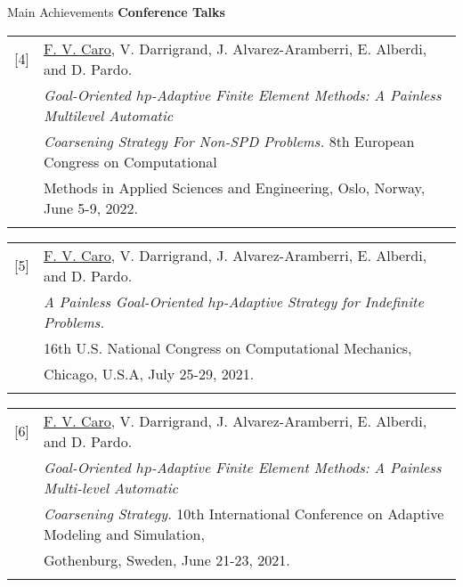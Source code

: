 \begin{frame}{Main Achievements}
\textbf{Conference Talks}
\vspace{0.2cm}

\begin{small}
\begin{tabular}{rl}
[4]&\underline{F. V. Caro}, V. Darrigrand, J. Alvarez-Aramberri, E. Alberdi, and D. Pardo. \\
& \textit{Goal-Oriented $hp$-Adaptive Finite Element Methods: A Painless Multilevel Automatic} \\
& \textit{Coarsening Strategy For Non-SPD Problems.} 8th European Congress on Computational \\
& Methods in Applied Sciences and Engineering, Oslo, Norway, June 5-9, 2022. \\\\
\end{tabular}

\begin{tabular}{rl}
[5]&\underline{F. V. Caro}, V. Darrigrand, J. Alvarez-Aramberri, E. Alberdi, and D. Pardo. \\
& \textit{A Painless Goal-Oriented $hp$-Adaptive Strategy for Indefinite Problems.} \\
& 16th U.S. National Congress on Computational Mechanics, \\
& Chicago, U.S.A, July 25-29, 2021. \\\\
\end{tabular}

\begin{tabular}{rl}
[6]&\underline{F. V. Caro}, V. Darrigrand, J. Alvarez-Aramberri, E. Alberdi, and D. Pardo. \\
& \textit{Goal-Oriented $hp$-Adaptive Finite Element Methods: A Painless Multi-level Automatic} \\
& \textit{Coarsening Strategy.} 10th International Conference on Adaptive Modeling and Simulation, \\
& Gothenburg, Sweden, June 21-23, 2021. \\\\
\end{tabular}
\end{small}

\end{frame}

